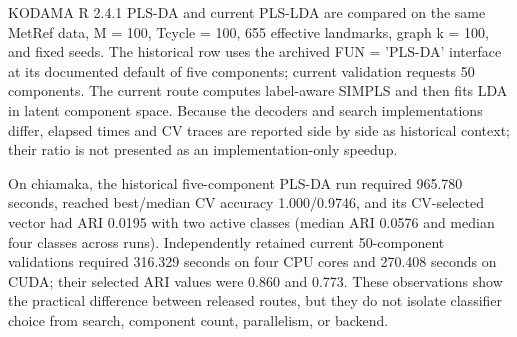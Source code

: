 \documentclass[twoside,11pt]{article}
\begin{document}
\begin{small}
\begin{table}[h]
\caption{KNN-compatible MetRef predecessor comparison at M = 100 and Tcycle = 100. Speedup is relative to KODAMA R 2.4.1/2.4.}
\small
{}
\end{table}

KODAMA R 2.4.1 PLS-DA and current PLS-LDA are compared on the same MetRef data, M = 100, Tcycle = 100, 655 effective landmarks, graph k = 100, and fixed seeds. The historical row uses the archived FUN = 'PLS-DA' interface at its documented default of five components; current validation requests 50 components. The current route computes label-aware SIMPLS and then fits LDA in latent component space. Because the decoders and search implementations differ, elapsed times and CV traces are reported side by side as historical context; their ratio is not presented as an implementation-only speedup.

On chiamaka, the historical five-component PLS-DA run required 965.780 seconds, reached best/median CV accuracy 1.000/0.9746, and its CV-selected vector had ARI 0.0195 with two active classes (median ARI 0.0576 and median four classes across runs). Independently retained current 50-component validations required 316.329 seconds on four CPU cores and 270.408 seconds on CUDA; their selected ARI values were 0.860 and 0.773. These observations show the practical difference between released routes, but they do not isolate classifier choice from search, component count, parallelism, or backend.


\end{small}
\end{document}
